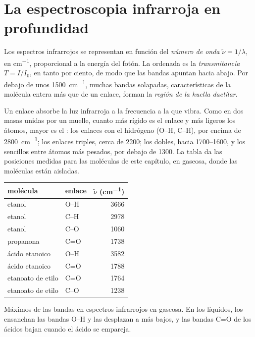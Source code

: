 \section{La espectroscopia infrarroja en profundidad}

\begin{definition}\label{def:b1:structure-spectroscopy:wavenumber}
Los espectros infrarrojos se representan en función del \emph{número de
onda} $\tilde\nu = 1/\lambda$, en \unit{cm^{-1}},
proporcional a la energía del fotón. La ordenada es la
\emph{transmitancia} $T = I/I_0$, en tanto por
ciento, de modo que las bandas apuntan hacia abajo. Por debajo de unos
\qty{1500}{cm^{-1}}, muchas bandas solapadas, características de la
molécula entera más que de un enlace, forman la \emph{región de la huella
dactilar}.
\end{definition}

Un enlace absorbe la luz infrarroja a la frecuencia a la que vibra. Como
en dos masas unidas por un muelle, cuanto más rígido es el enlace y más
ligeros los átomos, mayor es el : los enlaces con el
hidrógeno (O--H, C--H), por encima de \qty{2800}{cm^{-1}}; los enlaces
triples, cerca de 2200; los dobles, hacia 1700--1600, y los sencillos
entre átomos más pesados, por debajo de 1300. La tabla da las posiciones
medidas para las moléculas de este capítulo, en  gaseosa, donde las
moléculas están aisladas.

\begin{omfigure}
\begin{tabular}{llr}
\hline
molécula & enlace & $\tilde\nu$ (\unit{cm^{-1}}) \\
\hline
etanol & O--H & 3666 \\
etanol & C--H & 2978 \\
etanol & C--O & 1060 \\
propanona & C=O & 1738 \\
ácido etanoico & O--H & 3582 \\
ácido etanoico & C=O & 1788 \\
etanoato de etilo & C=O & 1764 \\
etanoato de etilo & C--O & 1238 \\
\hline
\end{tabular}

\smallskip
{\small Máximos de las bandas en espectros infrarrojos en  gaseosa.
En los líquidos, los  ensanchan las bandas O--H y las
desplazan a  más bajos, y las bandas C=O de los ácidos
bajan cuando el ácido se empareja.}
\end{omfigure}

